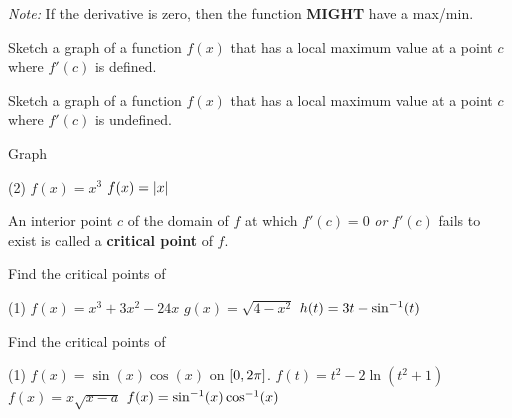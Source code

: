 \documentclass[mathNotesPreamble]{subfiles}
\begin{document}
\noindent
{}
\begin{center}
  \textit{Note:} If the derivative is zero, then the function \textbf{MIGHT} have a max/min.  
\end{center}

\begin{ex*}
  Sketch a graph of a function $f(x)$ that has a local maximum value at a point $c$ where $f'(c)$ is defined.
\end{ex*}
\begin{ex*}
  Sketch a graph of a function $f(x)$ that has a local maximum value at a point $c$ where $f'(c)$ is undefined.
\end{ex*}
\begin{ex*}
  Graph 
  \begin{tasks}(2)
    \task $f(x)=x^3$
    \task $f(x)={\left\vert x\right\vert}$
  \end{tasks}
\end{ex*}
\pagebreak
\begin{defn*}
  An interior point $c$ of the domain of $f$ at which $f'(c)=0$ \textit{or} $f'(c)$ fails to exist is called a \textbf{critical point} of $f$.
\end{defn*}
\begin{ex*}
  Find the critical points of
\end{ex*}
\begin{tasks}[after-item-skip=\stretch{1}, label=~](1)
  \task $f(x)=x^3+3x^2-24x$
  \task $g(x)=\sqrt{4-x^2}$
  \task $h(t)=3t-\sin^{-1}(t)$
\end{tasks}
\pagebreak
\begin{ex*}
  Find the critical points of
\end{ex*}
\begin{tasks}[after-item-skip=\stretch{1}, label=~](1)
  \task $f(x)=\sin(x)\cos(x)$ on ${\left[0,2\pi\right]}$. 
  \task $f(t)=t^2-2\ln(t^2+1)$
  \task $f(x)=x\sqrt{x-a}$
  \task $f(x)=\sin^{-1}(x)\cos^{-1}(x)$
\end{tasks}
\pagebreak
\end{document}
